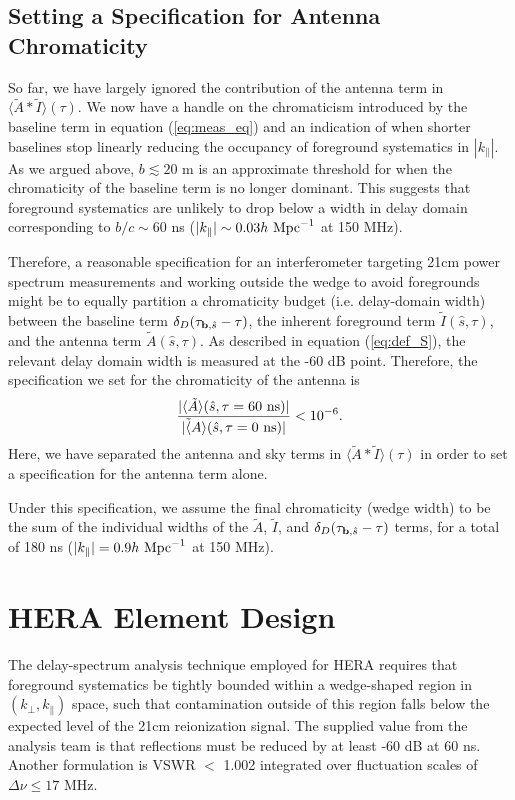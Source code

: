 \documentclass[11pt]{article}
\newcommand{\bvec}{{\bf b}}
\newcommand{\shat}{{\hat s}}
\newcommand{\kpr}{{k_\perp}}
\newcommand{\kpl}{{k_\parallel}}
\newcommand{\AI}{{\langle\tilde A*\tilde I\rangle}}
\newcommand{\AItau}{{\AI(\tau)}}
\newcommand{\hMpci}{{h~{\rm Mpc}^{-1}}}
\begin{document}
\subsection{Setting a Specification for Antenna Chromaticity}

So far, we have largely ignored the contribution of the antenna term in $\AItau$.  We now have
a handle on the chromaticism introduced by the baseline term in equation (\ref{eq:meas_eq}) and 
an indication of when shorter baselines stop linearly reducing the occupancy of
foreground systematics in $|\kpl|$.  As we argued above, $b\lesssim20$ m is an approximate threshold
for when the chromaticity of the baseline term is no longer dominant.  This suggests that
foreground systematics are unlikely to drop below a width in delay domain corresponding to 
$b/c\sim60$ ns ($|\kpl|\sim0.03\hMpci$ at 150 MHz).

Therefore, a reasonable specification 
for an interferometer targeting 21cm power spectrum measurements and working outside
the wedge to avoid foregrounds might be to equally partition a chromaticity budget (i.e. delay-domain
width) between the baseline term $\delta_D(\tau_{\bvec,\shat}-\tau)$, 
the inherent foreground term $\tilde I(\shat,\tau)$, and the antenna term $\tilde A(\shat,\tau)$.
As described in equation (\ref{eq:def_S}), the relevant delay domain width 
is measured at the -60 dB point.  Therefore, the specification we set for the chromaticity
of the antenna is
\begin{equation}
\frac{|\langle\tilde A\rangle(\shat,\tau=60~{\rm ns})|}{|\tilde \langle A\rangle(\shat,\tau=0~{\rm ns})|}<10^{-6}.
\label{eq:A_req}
\end{equation}
Here, we have separated the antenna and sky terms in $\AItau$ in order to set a specification for
the antenna term alone.

Under this specification, we assume the final chromaticity (wedge width) to be the sum of the
individual widths of the $\tilde A$, $\tilde I$, and $\delta_D(\tau_{\bvec,\shat}-\tau)$ terms,
for a total of 180 ns ($|\kpl|=0.9\hMpci$ at 150 MHz).

\section{HERA Element Design}

The delay-spectrum analysis technique employed for HERA requires that foreground
systematics be tightly bounded within a wedge-shaped region in $(\kpr,\kpl)$ space,
such that contamination outside of this region falls
below the expected level of the 21cm reionization signal.
The supplied value from the analysis team is that reflections must be reduced
by at least -60 dB at 60 ns.  Another formulation is VSWR $<$ 1.002 integrated %
over fluctuation scales of $\Delta\nu\leq17$ MHz.
\end{document}
